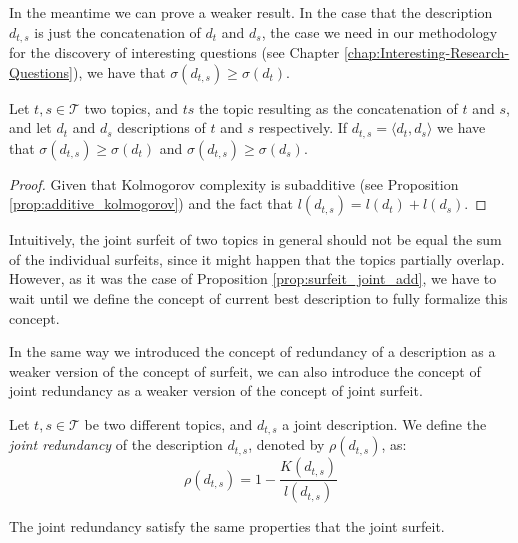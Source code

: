 In the meantime we can prove a weaker result. In the case that the description $d_{t,s}$ is just the concatenation of $d_t$ and $d_s$, the case we need in our methodology for the discovery of interesting questions (see Chapter \ref{chap:Interesting-Research-Questions}), we have that $\sigma(d_{t,s}) \geq \sigma(d_t)$.

\begin{proposition}
\label{prop:surfeit_joint_add}
Let $t, s \in \mathcal{T}$ two topics, and $ts$ the topic resulting as the concatenation of $t$ and $s$, and let $d_t$ and $d_s$ descriptions of $t$ and $s$ respectively. If $d_{t,s} = \langle d_t, d_s \rangle$ we have that  $\sigma(d_{t,s}) \geq \sigma(d_t)$  and $\sigma(d_{t,s}) \geq \sigma(d_s)$.
\end{proposition}
\begin{proof}
Given that Kolmogorov complexity is subadditive (see Proposition \ref{prop:additive_kolmogorov}) and the fact that $l(d_{t,s}) = l(d_t) + l(d_s)$.
\end{proof}

Intuitively, the joint surfeit of two topics in general should not be equal the sum of the individual surfeits, since it might happen that the topics partially overlap. However, as it was the case of Proposition \ref{prop:surfeit_joint_add}, we have to wait until we define the concept of current best description to fully formalize this concept.

In the same way we introduced the concept of redundancy of a description as a weaker version of the concept of surfeit, we can also introduce the concept of joint redundancy as a weaker version of the concept of joint surfeit.

\begin{definition}
Let $t,s \in \mathcal{T}$ be two different topics, and $d_{t,s}$ a joint description. We define the \emph{joint redundancy} of the description $d_{t,s}$, denoted by $\rho(d_{t,s})$, as: 
\[
\rho(d_{t,s}) = 1 - \frac{K\left( d_{t,s} \right)}{l \left( d_{t,s} \right)}
\]
\end{definition}

The joint redundancy satisfy the same properties that the joint surfeit.

